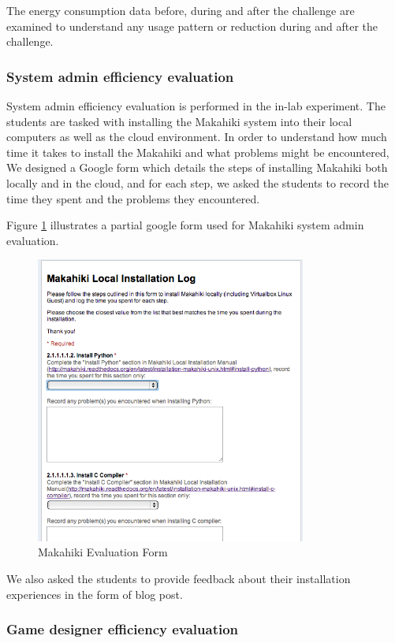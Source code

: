 \documentclass{sigchi}
\begin{document}
The energy consumption data before, during and after the challenge are examined to understand any usage pattern or reduction during and after the challenge.

\subsubsection{System admin efficiency evaluation}

System admin efficiency evaluation is performed in the in-lab experiment. The students are tasked with installing the Makahiki system into their local computers as well as the cloud environment. In order to understand how much time it takes to install the Makahiki and what problems might be encountered, We designed a Google form which details the steps of installing Makahiki both locally and in the cloud, and for each step, we asked the students to record the time they spent and the problems they encountered.

Figure \ref{fig:makahiki-eval-form} illustrates a partial google form used for Makahiki system admin evaluation.

\begin{figure}[ht!]
   \centering
   \includegraphics[width=3.5in]{developer-eval-form}
   \caption{Makahiki Evaluation Form}
   \label{fig:makahiki-eval-form}
\end{figure}

We also asked the students to provide feedback about their installation experiences in the form of blog post.

\subsubsection{Game designer efficiency evaluation}
\end{document}
